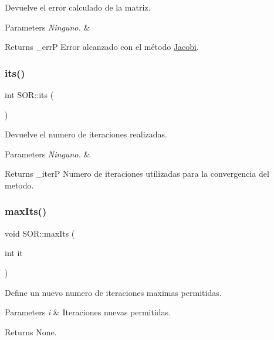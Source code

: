 Devuelve el error calculado de la matriz. 


\begin{DoxyParams}{Parameters}
{\em Ninguno.} & \\
\hline
\end{DoxyParams}
\begin{DoxyReturn}{Returns}
\+\_\+errP Error alcanzado con el método \hyperlink{class_jacobi}{Jacobi}. 
\end{DoxyReturn}
\hypertarget{class_s_o_r_a8300b64a510db083985308e8355a24ce}{}\label{class_s_o_r_a8300b64a510db083985308e8355a24ce} 
\subsubsection{\texorpdfstring{its()}{its()}}
{\footnotesize\ttfamily int S\+O\+R\+::its (\begin{DoxyParamCaption}{ }\end{DoxyParamCaption})\hspace{0.3cm}{\ttfamily [inline]}}



Devuelve el numero de iteraciones realizadas. 


\begin{DoxyParams}{Parameters}
{\em Ninguno.} & \\
\hline
\end{DoxyParams}
\begin{DoxyReturn}{Returns}
\+\_\+iterP Numero de iteraciones utilizadas para la convergencia del metodo. 
\end{DoxyReturn}
\hypertarget{class_s_o_r_a32b87de870efe119b61b84d0f521e81c}{}\label{class_s_o_r_a32b87de870efe119b61b84d0f521e81c} 
\subsubsection{\texorpdfstring{max\+Its()}{maxIts()}}
{\footnotesize\ttfamily void S\+O\+R\+::max\+Its (\begin{DoxyParamCaption}\item[{int}]{it }\end{DoxyParamCaption})\hspace{0.3cm}{\ttfamily [inline]}}



Define un nuevo numero de iteraciones maximas permitidas. 


\begin{DoxyParams}{Parameters}
{\em i} & Iteraciones nuevas permitidas. \\
\hline
\end{DoxyParams}
\begin{DoxyReturn}{Returns}
None. 
\end{DoxyReturn}
\hypertarget{class_s_o_r_a8af2a594824ed5a658035d9f1865df26}{}\label{class_s_o_r_a8af2a594824ed5a658035d9f1865df26} 
